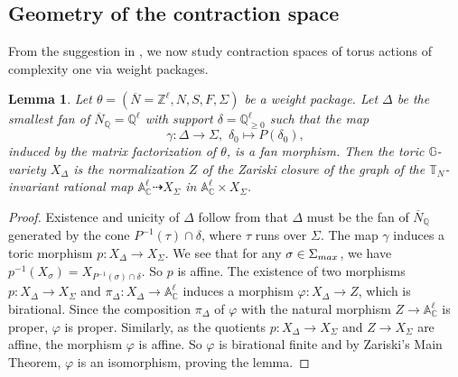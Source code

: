 \documentclass[11pt, reqno]{amsart}
\theoremstyle{plain}
\newtheorem{lemma}[theorem]{Lemma}
\theoremstyle{definition}
\theoremstyle{remark}
\begin{document}
\subsection{Geometry of the contraction space}
From the suggestion in \cite[Section 4.2, Remark 15]{AIPSV12},
we now study contraction spaces of torus actions of complexity one via weight packages. 
\begin{lemma}\label{lemma-Delta}
Let $\theta =  (\overline{N} =  \mathbb{Z}^{\ell}, N, S, F, \Sigma)$ be a weight package. Let $\Delta$ be the smallest fan of $\overline{N}_{ \mathbb{Q}} =  \mathbb{Q}^{\ell}$ with support $\delta = \mathbb{Q}_{\geq 0}^{\ell}$ such that the map
$$\gamma:\Delta\rightarrow \Sigma, \,\, \delta_{0}\mapsto P(\delta_{0}),$$
induced by the matrix factorization of $\theta$, is a fan morphism. Then the toric $\mathbb{G}$-variety $X_{\Delta}$ is
 the normalization $Z$ of the Zariski closure of the graph of the $\mathbb{T}_{N}$-invariant rational map $\mathbb{A}_{\mathbb{C}}^{\ell}\dashrightarrow X_{\Sigma}$ in $\mathbb{A}_{\mathbb{C}}^{\ell}\times X_{\Sigma}$. 
\end{lemma}
\begin{proof}
Existence and unicity of $\Delta$ follow from that $\Delta$ must be the fan of $\overline{N}_{\mathbb{Q}}$
generated by the cone $P^{-1}(\tau)\cap \delta$, where $\tau$ runs over $\Sigma$. The map $\gamma$ induces a toric morphism
$p: X_{\Delta}\rightarrow X_{\Sigma}$. We see that for any $\sigma\in\Sigma_{\rm max}$,
we have $p^{-1}(X_{\sigma}) =  X_{P^{-1}(\sigma)\cap \delta}$.  So $p$ is affine. The existence of two morphisms $p:X_{\Delta}\rightarrow X_{\Sigma}$
and $\pi_{\Delta}: X_{\Delta}\rightarrow \mathbb{A}_{\mathbb{C}}^{\ell}$ induces a morphism $\varphi: X_{\Delta}\rightarrow Z$, which is birational. Since the composition $\pi_{\Delta}$ of $\varphi$ with the natural morphism $Z\rightarrow \mathbb{A}_{\mathbb{C}}^{\ell}$ is proper, $\varphi$ is proper.
Similarly, as the quotients $p:X_{\Delta}\rightarrow X_{\Sigma}$ and $Z\rightarrow X_{\Sigma}$ are affine, the morphism $\varphi$ is affine. So $\varphi$ is birational finite and by Zariski's Main Theorem, $\varphi$ is an isomorphism, proving the lemma. 
\end{proof}
\end{document}
